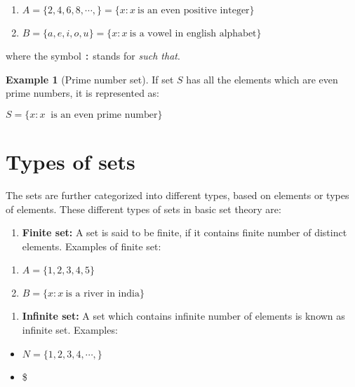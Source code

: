 \documentclass[
]{book}
\providecommand{\tightlist}{%
  \setlength{\itemsep}{0pt}\setlength{\parskip}{0pt}}
\theoremstyle{definition}
\theoremstyle{definition}
\newtheorem{example}{Example}[chapter]
\theoremstyle{definition}
\theoremstyle{definition}
\theoremstyle{remark}
\begin{document}
\begin{enumerate}
\def\labelenumi{\arabic{enumi}.}
\item
  \(A=\{2,4,6,8,\cdots,\}=\{x:x~ \text{is an even positive integer}\}\)
\item
  \(B=\{a,e,i,o,u\}=\{x: x~ \text{is a vowel in english alphabet}\}\)
\end{enumerate}

where the symbol \texttt{:} stands for \emph{such that}.

\begin{example}[Prime number set]
\protect\hypertarget{exm:ex3}{}\label{exm:ex3}If set \(S\) has all the elements which are even prime numbers, it is represented as:

\(S=\{ x: x~\text{ is an even prime number}\}\)
\end{example}

\hypertarget{types-of-sets}{%
\section{Types of sets}\label{types-of-sets}}

The sets are further categorized into different types, based on elements or types of elements. These different types of sets in basic set theory are:

\begin{enumerate}
\def\labelenumi{\arabic{enumi}.}
\tightlist
\item
  \textbf{Finite set:} A set is said to be finite, if it contains finite number of distinct elements. Examples of finite set:
\end{enumerate}

\begin{enumerate}
\def\labelenumi{\roman{enumi}.}
\tightlist
\item
  \(A=\{1,2,3,4,5\}\)
\item
  \(B=\{x:x~\text{is a river in india}\}\)
\end{enumerate}

\begin{enumerate}
\def\labelenumi{\arabic{enumi}.}
\setcounter{enumi}{1}
\tightlist
\item
  \textbf{Infinite set:} A set which contains infinite number of elements is known as infinite set. Examples:
\end{enumerate}

\begin{itemize}
\tightlist
\item
  \(N=\{1,2,3,4,\cdots, \}\)
\item
  \$
\end{itemize}
\end{document}

